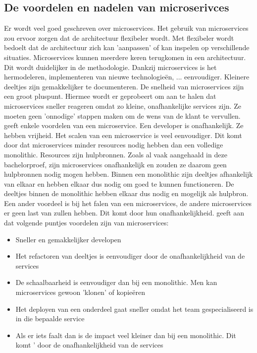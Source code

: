 \subsection{De voordelen en nadelen van microserivces}
Er wordt veel goed geschreven over microservices. Het gebruik van microservices zou ervoor zorgen dat de architectuur flexibeler wordt. Met flexibeler wordt bedoelt dat de architectuur zich kan 'aanpassen' of kan inspelen op verschillende situaties. Microservices kunnen meerdere keren terugkomen in een architectuur. Dit wordt duidelijker in de methodologie. Dankzij microservices is het hermodeleren, implementeren van nieuwe  technologieën, ... eenvoudiger.
Kleinere deeltjes zijn gemakkelijker te documenteren. De snelheid van microservices zijn een groot pluspunt. Hiermee wordt er geprobeert om aan te halen dat microservices sneller reageren omdat zo kleine, onafhankelijke services zijn. Ze moeten geen 'onnodige' stappen maken om de  wens van de klant te vervullen. 
\textcite{Watts2018} geeft enkele voordelen van een microservice. Een developer is onafhankelijk. Ze hebben vrijheid. Het scalen van een microservice is veel eenvoudiger. Dit komt door dat microservices minder resources nodig hebben dan een volledige monolithic. Resources zijn hulpbronnen. Zoals al vaak aangehaald in deze bachelorproef, zijn microservices onafhankelijk en zouden ze daarom geen hulpbronnen nodig mogen hebben. Binnen een monolithic zijn deeltjes afhankelijk van elkaar en hebben elkaar dus nodig om goed te kunnen functioneren. De deeltjes binnen de monolithic hebben elkaar dus nodig en mogelijk als hulpbron. Een ander voordeel is bij het falen van een microservices, de andere microservices er geen last van zullen hebben. Dit komt door hun onafhankelijkheid. 
\textcite{Benetis2016} geeft aan dat volgende puntjes voordelen zijn van microservices:
\begin{itemize}
	\item Sneller en gemakkelijker developen
	\item Het refactoren van deeltjes is eenvoudiger door de onafhankelijkheid van de services
	\item De schaalbaarheid is eenvoudiger dan bij een monolithic. Men kan microservices gewoon 'klonen' of kopieëren
	\item Het deployen van een onderdeel gaat sneller omdat het team gespecialiseerd is in die bepaalde service
	\item Als er iets faalt dan is de impact veel kleiner dan bij een monolithic. Dit komt ' door de onafhankelijkheid van de services
\end{itemize}
